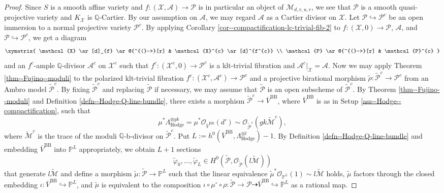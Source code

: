 \documentclass[12pt,twoside]{amsart}
\theoremstyle{definition}
\begin{document}
\begin{proof}
Since $S$ is a smooth affine variety and $f\colon (\mathcal{X},\mathcal{A})\to\mathcal{P}$ is in particular an object of $\mathcal{M}_{d,v,u,r}$, we see that $\mathcal{P}$ is a smooth quasi-projective variety and $K_{\mathcal{X}}$ is $\mathbb{Q}$-Cartier. 
By our assumption on $\mathcal{A}$, we may regard $\mathcal{A}$ as a Cartier divisor on $\mathcal{X}$. 
Let $\mathcal{P} \hookrightarrow \mathcal{P}^{c}$ be an open immersion to a normal projective variety $\mathcal{P}^{c}$. 
By applying Corollary \ref{cor--compactification-lc-trivial-fib-2} to $f\colon (\mathcal{X},0)\to\mathcal{P}$, $\mathcal{A}$, and $\mathcal{P} \hookrightarrow \mathcal{P}^{c}$, we get a diagram
$$
\xymatrix
{
\mathcal{X} \ar[d]_{f} \ar@{^{(}->}[r] & \mathcal{X}^{c} \ar[d]^{f^{c}} 
\\
\mathcal{P} \ar@{^{(}->}[r] & \mathcal{P}^{c}  
}
$$
and an $f^{c}$-ample $\mathbb{Q}$-divisor $\mathcal{A}^{c}$ on $\mathcal{X}^{c}$ such that $f^{c} \colon (\mathcal{X}^{c},0) \to \mathcal{P}^{c}$ is a klt-trivial fibration and $\mathcal{A}^{c}|_{\mathcal{X}}=\mathcal{A}$. 
Now we may apply Theorem \ref{thm--Fujino--moduli} to the polarized klt-trivial fibration $f^{c} \colon (\mathcal{X}^{c},\mathcal{A}^{c}) \to \mathcal{P}^{c}$ and a projective birational morphism $\widetilde{\rho} \colon \widetilde{\mathcal{P}}^{c} \to \mathcal{P}^{c}$ from an Ambro model $\widetilde{\mathcal{P}}^{c}$. 
By fixing $\widetilde{\mathcal{P}}^{c}$ and replacing $\widetilde{\mathcal{P}}$ if necessary, we may assume that $\widetilde{\mathcal{P}}$ is an open subscheme of $\widetilde{\mathcal{P}}^{c}$. 
By Theorem \ref{thm--Fujino--moduli} and Definition \ref{defn--Hodge-Q-line-bundle}, 
there exists a morphism $\widetilde{\mathcal{P}}^{c} \to  \overline{V}^{\mathrm{BB}}$, where $\overline{V}^{\mathrm{BB}}$ is as in Setup \ref{ass--Hodge--compactification}, such that 
\begin{equation*}
\mu^*\Lambda^{\otimes gk}_{\mathrm{Hodge}}=\mu^*\mathcal{O}_{\overline{V}^{\mathrm{BB}}}(d')\sim \mathcal{O}_{\widetilde{\mathcal{P}}^{c}}(gk\widetilde{\mathcal{M}}^{c}),
\end{equation*}
where $\widetilde{\mathcal{M}}^{c}$ is the trace of the moduli $\mathbb{Q}$-b-divisor on $\widetilde{\mathcal{P}}^{c}$. 
Put $L:=h^0(\overline{V}^{\mathrm{BB}},\Lambda^{\otimes l}_{\mathrm{Hodge}})-1$. 
By Definition \ref{defn--Hodge-Q-line-bundle} and embedding $\overline{V}^{\mathrm{BB}}$ into $\mathbb{P}^{L}$ appropriately, we obtain $L+1$ sections $$\widetilde{\varphi}_0,\ldots,\widetilde{\varphi}_L\in H^0(\widetilde{\mathcal{P}},\mathcal{O}_{\widetilde{\mathcal{P}}}(l\widetilde{\mathcal{M}}))$$ that generate $l\widetilde{\mathcal{M}}$ and define a morphism $\widetilde{\mu}\colon\widetilde{\mathcal{P}}\to \mathbb{P}^L$ such that the linear equivalence $\widetilde{\mu}^*\mathcal{O}_{\mathbb{P}^{L}}(1)\sim l\widetilde{\mathcal{M}}$ holds, $\widetilde{\mu}$ factors through the closed embedding $\iota\colon \overline{V}^{\mathrm{BB}}\hookrightarrow \mathbb{P}^L$, and $\widetilde{\mu}$ is equivalent to the composition $\iota \circ \mu^\circ \circ \rho \colon\widetilde{\mathcal{P}}\to \mathcal{P} \dashrightarrow \overline{V}^{\mathrm{BB}}\hookrightarrow \mathbb{P}^L$ as a rational map. 

\end{proof}
\end{document}

